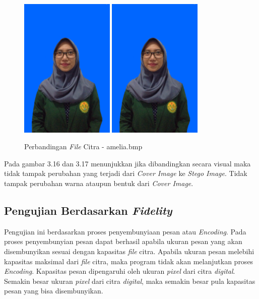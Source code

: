 	\begin{figure}[H]
		\centering
		\includegraphics[width=0.4\textwidth]{gambar/matlab/amelia}
		\includegraphics[width=0.4\textwidth]{gambar/matlab/amelia_kalimat}
		\caption{Perbandingan \emph{File} Citra - amelia.bmp}
		\label{amelia_stego}		
	\end{figure}


	Pada gambar 3.16 dan 3.17 menunjukkan jika dibandingkan secara visual maka tidak tampak perubahan yang terjadi dari \emph{Cover Image} ke \emph{Stego Image}. Tidak tampak perubahan warna ataupun bentuk dari \emph{Cover Image}.

	\subsection{Pengujian Berdasarkan \emph{Fidelity}}
	Pengujian ini berdasarkan proses penyembunyiaan pesan atau \emph{Encoding}. Pada proses penyembunyian pesan dapat berhasil apabila ukuran pesan yang akan disembunyikan sesuai dengan kapasitas \emph{file} citra. Apabila ukuran pesan melebihi kapasitas maksimal dari \emph{file} citra, maka program tidak akan melanjutkan proses \emph{Encoding}. Kapasitas pesan dipengaruhi oleh ukuran \emph{pixel} dari citra \emph{digital}. Semakin besar ukuran \emph{pixel} dari citra \emph{digital}, maka semakin besar pula kapasitas pesan yang bisa disembunyikan.
	

